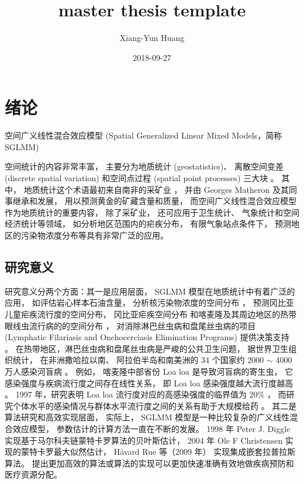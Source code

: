 \documentclass[12pt,a4paper,UTF8,twoside]{book}
\title{master thesis template}
\author{Xiang-Yun Huang}
\date{2018-09-27}
\theoremstyle{definition}
\theoremstyle{definition}
\theoremstyle{definition}
\theoremstyle{remark}
\begin{document}





{
\setcounter{tocdepth}{2}
\tableofcontents
}

\mainmatter

\hypertarget{intro}{%
\chapter{绪论}\label{intro}}

空间广义线性混合效应模型 (Spatial Generalized Linear Mixed Models，简称
SGLMM)

空间统计的内容非常丰富， 主要分为地质统计 (geostatistics)、 离散空间变差
(discrete spatial variation) 和空间点过程 (spatial point processes)
三大块 \citep{Cressie1993}。 其中， 地质统计这个术语最初来自南非的采矿业
\citep{Krige1951}， 并由 Georges Matheron 及其同事继承和发展，
用以预测黄金的矿藏含量和质量，
而空间广义线性混合效应模型作为地质统计的重要内容， 除了采矿业，
还可应用于卫生统计、 气象统计和空间经济统计等领域，
如分析地区范围内的疟疾分布， 有限气象站点条件下，
预测地区的污染物浓度分布等具有非常广泛的应用。

\hypertarget{motivations}{%
\section{研究意义}\label{motivations}}

研究意义分两个方面：其一是应用层面， SGLMM
模型在地质统计中有着广泛的应用， 如评估岩心样本石油含量，
分析核污染物浓度的空间分布 \citep{Diggle1998}，
预测冈比亚儿童疟疾流行度的空间分布， 冈比亚疟疾空间分布
\citep{Thomson1999} \citep{Diggle2002Childhood}
和喀麦隆及其周边地区的热带眼线虫流行病的的空间分布
\citep{Diggle2007ATMP}， 对消除淋巴丝虫病和盘尾丝虫病的项目 (Lymphatic
Filariasis and Onchocerciasis Elimination Programs) 提供决策支持
\citep{Schl2016Using}。
在热带地区，淋巴丝虫病和盘尾丝虫病是严峻的公共卫生问题，
据世界卫生组织统计， 在非洲撒哈拉以南、 阿拉伯半岛和南美洲的 34 个国家约
2000 \(\sim\) 4000 万人感染河盲病 \citep{Takougang2002Rapid}。 例如，
喀麦隆中部省份 Loa loa 是导致河盲病的寄生虫，
它感染强度与疾病流行度之间存在线性关系， 即 Loa loa
感染强度越大流行度越高 \citep{Boussinesq2001}。 1997 年，研究表明 Loa
loa 流行度对应的高感染强度的临界值为 20\% \citep{Gardon1997Serious}，
而研究个体水平的感染情况与群体水平流行度之间的关系有助于大规模给药
\citep{Schl2016Using}。 其二是算法研究和高效实现层面， 实际上， SGLMM
模型是一种比较复杂的广义线性混合效应模型，
参数估计的计算方法一直在不断的发展。 1998 年 Peter J. Diggle
实现基于马尔科夫链蒙特卡罗算法的贝叶斯估计， 2004 年 Ole F Christensen
实现的蒙特卡罗最大似然估计， Håvard Rue 等（2009 年）
实现集成嵌套拉普拉斯算法。
提出更加高效的算法或算法的实现可以更加快速准确有效地做疾病预防和医疗资源分配。
\end{document}
